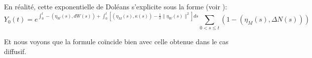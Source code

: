 \documentclass[../finalreport.tex]{subfiles}
\begin{document}
\par En réalité, cette exponentielle de Doléans s'explicite sous la forme (voir \cite[p.~491]{book1}):
\begin{equation} \label{doleans_explicite}
Y_0 \left( t \right) =  e^{\int_{0}^{t} - \left( \eta_W \left( s \right), d W \left( s \right) \right) +  \int_{0}^{t} \left[\left( \eta_M \left( s \right), \kappa \left( s \right) \right) - \frac{1}{2} \| \eta_W \left( s \right)\|^2 \right] ds} \sum\limits_{0 < s \leq t} \left( 1 - \left( \eta_M \left( s \right), \Delta N \left( s \right) \right) \right)
\end{equation}
\par Et nous voyons que la formule coïncide bien avec celle obtenue dans le cas diffusif.
\end{document}

